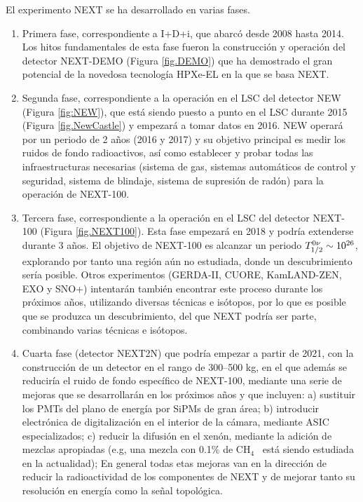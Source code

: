 El experimento NEXT se ha desarrollado en varias fases. 
 \begin{enumerate}
\item Primera fase, correspondiente a I+D+i, que abarcó desde 2008 hasta 2014. Los hitos fundamentales de esta fase fueron la construcción y operación del detector NEXT-DEMO (Figura \ref{fig.DEMO}) que ha demostrado el gran potencial de la novedosa tecnología HPXe-EL en la que se basa NEXT. 
\item Segunda fase, correspondiente a la operación en el LSC del detector NEW (Figura \ref{fig:NEW}), que está siendo puesto a punto en el LSC durante 2015 (Figura \ref{fig.NewCastle}) y empezará a tomar datos en 2016. NEW operará por un periodo de 2 años (2016 y 2017) y su objetivo principal es medir los ruidos de fondo radioactivos, así como establecer y probar todas las infraestructuras necesarias (sistema de gas, sistemas automáticos de control y seguridad, sistema de blindaje, sistema de supresión de radón) para la operación de NEXT-100.
\item Tercera fase, correspondiente a  la operación en el LSC del detector NEXT-100  (Figura \ref{fig.NEXT100}). Esta fase empezará en 2018 y podría extenderse durante 3 años.
 El objetivo de NEXT-100 es alcanzar un periodo 
$T_{1/2}^{0\nu} \sim 10^{26}$, explorando por tanto una región aún no estudiada, donde un descubrimiento sería posible.  Otros experimentos (GERDA-II, CUORE, KamLAND-ZEN, EXO y SNO+) intentarán también encontrar este proceso durante los próximos años, utilizando diversas técnicas e isótopos, por lo que es posible que se produzca un descubrimiento, del que NEXT podría ser parte, combinando varias técnicas e isótopos. 
\item Cuarta fase (detector NEXT2N) que podría empezar a partir de 2021, con la construcción de un detector en el rango de 300--500 kg, en el que además se reduciría el ruido de fondo específico de NEXT-100, mediante una serie de mejoras que se desarrollarán en los próximos años y que incluyen: a) sustituir los PMTs del plano de energía por SiPMs de gran área; b) introducir electrónica de digitalización en el interior de la cámara, mediante ASIC especializados; c) reducir la difusión en el xenón, mediante la adición de mezclas apropiadas (e.g, una mezcla con 0.1\% de CH$_4$~ está siendo estudiada en la actualidad); En general todas etas mejoras van en la dirección de reducir la radioactividad de los componentes de NEXT y de mejorar tanto su resolución en energía como la señal topológica. 
\end{enumerate}


